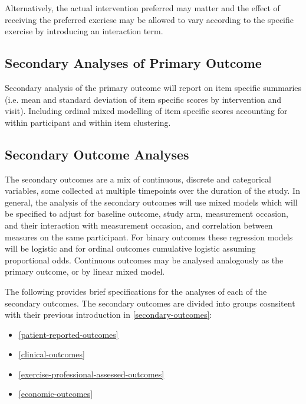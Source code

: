 \documentclass[11pt,parskip=half-]{scrartcl}
\providecommand{\tightlist}{%
  \setlength{\itemsep}{0pt}\setlength{\parskip}{0pt}}
\begin{document}
Alternatively, the actual intervention preferred may matter and the effect of receiving the preferred exericse may be allowed to vary according to the specific exercise by introducing an interaction term.


\subsection{Secondary Analyses of Primary Outcome}\label{secondary-analyses-primary}

Secondary analysis of the primary outcome will report on item specific summaries (i.e. mean and standard deviation of item specific scores by intervention and visit). Including ordinal mixed modelling of item specific scores accounting for within participant and within item clustering.

\subsection{Secondary Outcome Analyses}\label{secondary-outcome-analyses}

The secondary outcomes are a mix of continuous, discrete and categorical variables, some collected at multiple timepoints over the duration of the study. In general, the analysis of the secondary outcomes will use mixed models which will be specified to adjust for baseline outcome, study arm, measurement occasion, and their interaction with measurement occasion, and correlation between measures on the same participant. For binary outcomes these regression models will be logistic and for ordinal outcomes cumulative logistic assuming proportional odds. Continuous outcomes may be analysed analogously as the primary outcome, or by linear mixed model.

The following provides brief specifications for the analyses of each of the secondary outcomes. The secondary outcomes are divided into groups cosnsitent with their previous introduction in \ref{secondary-outcomes}:

\begin{itemize}
  \tightlist
  \item \ref{patient-reported-outcomes} 
  \item \ref{clinical-outcomes} 
  \item \ref{exercise-professional-assessed-outcomes} 
  \item \ref{economic-outcomes} 
\end{itemize}
\end{document}
